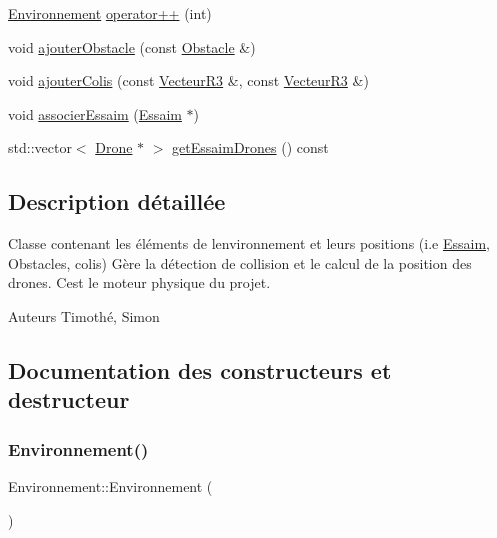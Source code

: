 \begin{DoxyCompactItemize}
\item 
\mbox{\hyperlink{class_environnement}{Environnement}} \mbox{\hyperlink{class_environnement_aab744830dace48734c8fc02a594a4a30}{operator++}} (int)
\item 
void \mbox{\hyperlink{class_environnement_ae6251ccc61f336420464c300fdc87bb6}{ajouter\+Obstacle}} (const \mbox{\hyperlink{class_obstacle}{Obstacle}} \&)
\item 
void \mbox{\hyperlink{class_environnement_aab113d02197cc05b272ff66876cca4f1}{ajouter\+Colis}} (const \mbox{\hyperlink{class_vecteur_r3}{Vecteur\+R3}} \&, const \mbox{\hyperlink{class_vecteur_r3}{Vecteur\+R3}} \&)
\item 
void \mbox{\hyperlink{class_environnement_aa4a7722b750e7628f571c2915ac8d51f}{associer\+Essaim}} (\mbox{\hyperlink{class_essaim}{Essaim}} $\ast$)
\item 
std\+::vector$<$ \mbox{\hyperlink{class_drone}{Drone}} $\ast$ $>$ \mbox{\hyperlink{class_environnement_a22fcd53c6a16d7aac217000f04efb064}{get\+Essaim\+Drones}} () const
\end{DoxyCompactItemize}


\subsection{Description détaillée}
Classe contenant les éléments de l\textquotesingle{}environnement et leurs positions (i.\+e \mbox{\hyperlink{class_essaim}{Essaim}}, Obstacles, colis) Gère la détection de collision et le calcul de la position des drones. C\textquotesingle{}est le moteur physique du projet.

\begin{DoxyAuthor}{Auteurs}
Timothé, Simon 
\end{DoxyAuthor}


\subsection{Documentation des constructeurs et destructeur}
\mbox{\label{class_environnement_aebf8b1591072ad4585fec2db39942f60}} 
\subsubsection{\texorpdfstring{Environnement()}{Environnement()}\hspace{0.1cm}{\footnotesize\ttfamily [1/2]}}
{\footnotesize\ttfamily Environnement\+::\+Environnement (\begin{DoxyParamCaption}{ }\end{DoxyParamCaption})}

